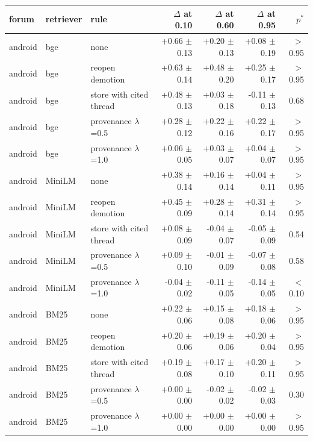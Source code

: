 \begin{tabular}{lllrrrr}
\toprule
forum & retriever & rule & $\Delta$ at 0.10 & $\Delta$ at 0.60 & $\Delta$ at 0.95 & $p^*$ \\
\midrule
android & bge & none & +0.66 $\pm$ 0.13 & +0.20 $\pm$ 0.13 & +0.08 $\pm$ 0.19 & $>$0.95 \\
android & bge & reopen demotion & +0.63 $\pm$ 0.14 & +0.48 $\pm$ 0.20 & +0.25 $\pm$ 0.17 & $>$0.95 \\
android & bge & store with cited thread & +0.48 $\pm$ 0.13 & +0.03 $\pm$ 0.18 & -0.11 $\pm$ 0.13 & 0.68 \\
android & bge & provenance $\lambda$=0.5 & +0.28 $\pm$ 0.12 & +0.22 $\pm$ 0.16 & +0.22 $\pm$ 0.17 & $>$0.95 \\
android & bge & provenance $\lambda$=1.0 & +0.06 $\pm$ 0.05 & +0.03 $\pm$ 0.07 & +0.04 $\pm$ 0.07 & $>$0.95 \\
\midrule
android & MiniLM & none & +0.38 $\pm$ 0.14 & +0.16 $\pm$ 0.14 & +0.04 $\pm$ 0.11 & $>$0.95 \\
android & MiniLM & reopen demotion & +0.45 $\pm$ 0.09 & +0.28 $\pm$ 0.14 & +0.31 $\pm$ 0.14 & $>$0.95 \\
android & MiniLM & store with cited thread & +0.08 $\pm$ 0.09 & -0.04 $\pm$ 0.07 & -0.05 $\pm$ 0.09 & 0.54 \\
android & MiniLM & provenance $\lambda$=0.5 & +0.09 $\pm$ 0.10 & -0.01 $\pm$ 0.09 & -0.07 $\pm$ 0.08 & 0.58 \\
android & MiniLM & provenance $\lambda$=1.0 & -0.04 $\pm$ 0.02 & -0.11 $\pm$ 0.05 & -0.14 $\pm$ 0.05 & $<$0.10 \\
\midrule
android & BM25 & none & +0.22 $\pm$ 0.06 & +0.15 $\pm$ 0.08 & +0.18 $\pm$ 0.06 & $>$0.95 \\
android & BM25 & reopen demotion & +0.20 $\pm$ 0.06 & +0.19 $\pm$ 0.06 & +0.20 $\pm$ 0.04 & $>$0.95 \\
android & BM25 & store with cited thread & +0.19 $\pm$ 0.08 & +0.17 $\pm$ 0.10 & +0.20 $\pm$ 0.11 & $>$0.95 \\
android & BM25 & provenance $\lambda$=0.5 & +0.00 $\pm$ 0.00 & -0.02 $\pm$ 0.02 & -0.02 $\pm$ 0.03 & 0.30 \\
android & BM25 & provenance $\lambda$=1.0 & +0.00 $\pm$ 0.00 & +0.00 $\pm$ 0.00 & +0.00 $\pm$ 0.00 & $>$0.95 \\
\bottomrule
\end{tabular}
